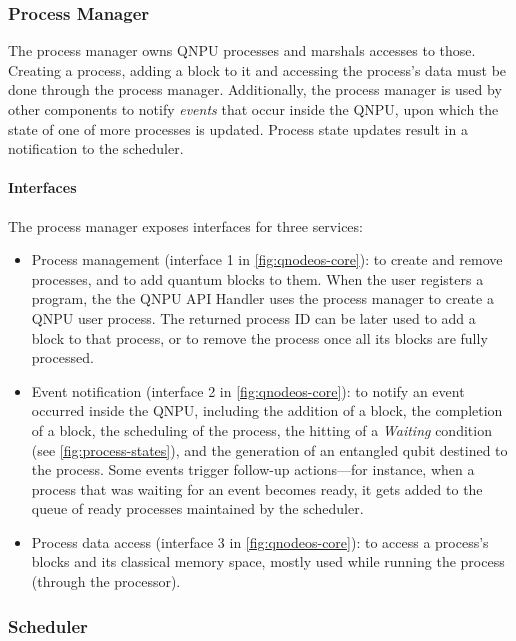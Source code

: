 \subsubsection{Process Manager}

The process manager owns \ac{QNPU} processes and marshals accesses to those. Creating a process, adding a block to it and accessing the process's data must be done through the process manager. Additionally, the process manager is used by other components to notify \emph{events} that occur inside the \ac{QNPU}, upon which the state of one of more processes is updated. Process state updates result in a notification to the scheduler.

\paragraph{Interfaces}

The process manager exposes interfaces for three services:
%
\begin{itemize}
\item Process management (interface 1 in \cref{fig:qnodeos-core}): to create and remove processes, and to add quantum blocks to them. When the user registers a program, the the \ac{QNPU} \ac{API} Handler uses the process manager to create a \ac{QNPU} user process. The returned process ID can be later used to add a block to that process, or to remove the process once all its blocks are fully processed.
\item Event notification (interface 2 in \cref{fig:qnodeos-core}): to notify an event occurred inside the \ac{QNPU}, including the addition of a block, the completion of a block, the scheduling of the process, the hitting of a \emph{Waiting} condition (see \cref{fig:process-states}), and the generation of an entangled qubit destined to the process. Some events trigger follow-up actions---for instance, when a process that was waiting for an event becomes ready, it gets added to the queue of ready processes maintained by the scheduler.
\item Process data access (interface 3 in \cref{fig:qnodeos-core}): to access a process's blocks and its classical memory space, mostly used while running the process (through the processor).
\end{itemize}

\subsubsection{Scheduler}

